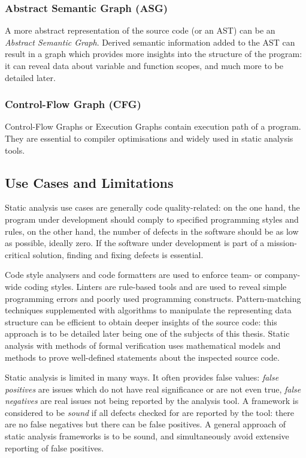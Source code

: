 \subsubsection{Abstract Semantic Graph (ASG)}

A more abstract representation of the source code (or an AST) can be an \emph{Abstract Semantic Graph}. Derived semantic information added to the AST can result in a graph which provides more insights into the structure of the program: it can reveal data about variable and function scopes, and much more to be detailed later.


\subsubsection{Control-Flow Graph (CFG)}

Control-Flow Graphs or Execution Graphs contain execution path of a program. They are essential to compiler optimisations and widely used in static analysis tools.


\subsection{Use Cases and Limitations}

Static analysis use cases are generally code quality-related: on the one hand, the program under development should comply to specified programming styles and rules, on the other hand, the number of defects in the software should be as low as possible, ideally zero. If the software under development is part of a mission-critical solution, finding and fixing defects is essential.

Code style analysers and code formatters are used to enforce team- or company-wide coding styles. Linters are rule-based tools and are used to reveal simple programming errors and poorly used programming constructs. Pattern-matching techniques supplemented with algorithms to manipulate the representing data structure can be efficient to obtain deeper insights of the source code: this approach is to be detailed later being one of the subjects of this thesis. Static analysis with methods of formal verification uses mathematical models and methods to prove well-defined statements about the inspected source code.

Static analysis is limited in many ways. It often provides false values: \emph{false positives} are issues which do not have real significance or are not even true, \emph{false negatives} are real issues not being reported by the analysis tool. A framework is considered to be \emph{sound} if all defects checked for are reported by the tool: there are no false negatives but there can be false positives. A general approach of static analysis frameworks is to be sound, and simultaneously avoid extensive reporting of false positives.~\cite{emanuelsson2008comparative}

